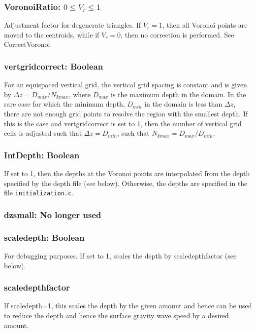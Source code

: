 \subsubsection{VoronoiRatio: $0\le V_r\le 1$}

Adjustment factor for degenerate triangles.  If $V_r=1$, then
all Voronoi points are moved to the centroids, while if $V_r=0$, 
then no correction is performed.  See CorrectVoronoi.

\subsubsection{vertgridcorrect: Boolean}

For an equispaced vertical grid, the vertical grid spacing is constant and
is given by $\Delta z=D_{max}/N_{kmax}$, where $D_{max}$ is the maximum depth in the domain.
In the rare case for which the minimum depth, $D_{min}$ in the domain is less than $\Delta z$, there
are not enough grid points to resolve the region with the smallest depth.  If this is the
case and vertgridcorrect
is set to 1, then the number of vertical grid cells is adjusted such that $\Delta z=D_{min}$,
such that $N_{kmax}=D_{max}/D_{min}$.

\subsubsection{IntDepth: Boolean}

If set to 1, then the depths at the Voronoi points are interpolated from the
depth specified by the depth file (see below).  Otherwise, the depths are
specified in the file \verb+initialization.c+.

\subsubsection{dzsmall: No longer used}

\subsubsection{scaledepth: Boolean}

For debugging purposes.  If set to 1, scales the depth by scaledepthfactor (see below).

\subsubsection{scaledepthfactor}

If scaledepth=1, this scales the depth by the given amount and hence
can be used to reduce the depth and hence the surface gravity wave speed by
a desired amount.

